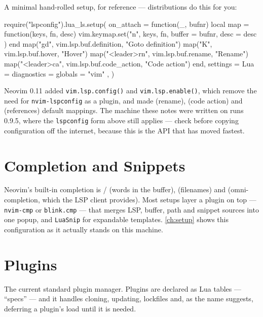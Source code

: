 A minimal hand-rolled setup, for reference --- distributions do this for you:

\begin{luacode}
require("lspconfig").lua_ls.setup({
  on_attach = function(_, bufnr)
    local map = function(keys, fn, desc)
      vim.keymap.set("n", keys, fn, { buffer = bufnr, desc = desc })
    end
    map("gd", vim.lsp.buf.definition, "Goto definition")
    map("K", vim.lsp.buf.hover, "Hover")
    map("<leader>rn", vim.lsp.buf.rename, "Rename")
    map("<leader>ca", vim.lsp.buf.code_action, "Code action")
  end,
  settings = { Lua = { diagnostics = { globals = { "vim" } } } },
})
\end{luacode}

\begin{remark}
	Neovim 0.11 added \texttt{vim.lsp.config()} and \texttt{vim.lsp.enable()},
	which remove the need for \texttt{nvim-lspconfig} as a plugin, and made
	   (rename),    (code action) and
	   (references) default mappings. The machine these notes
	were written on runs 0.9.5, where the \texttt{lspconfig} form above still
	applies --- check  before copying configuration off the internet,
	because this is the API that has moved fastest.
\end{remark}

\section{Completion and Snippets}

Neovim's built-in completion is  /  (words in the buffer),
  (filenames) and   (omni-completion,
which the LSP client provides). Most setups layer a plugin on top ---
\texttt{nvim-cmp} or \texttt{blink.cmp} --- that merges LSP, buffer, path and
snippet sources into one popup, and \texttt{LuaSnip} for expandable templates.
\autoref{ch:setup} shows this configuration as it actually stands on this
machine.

\section{Plugins}\label{sec:plugins}

\begin{definition}
	The current standard plugin manager. Plugins are declared as Lua tables ---
	``specs'' --- and it handles cloning, updating, lockfiles and, as the name
	suggests, deferring a plugin's load until it is needed.
\end{definition}


